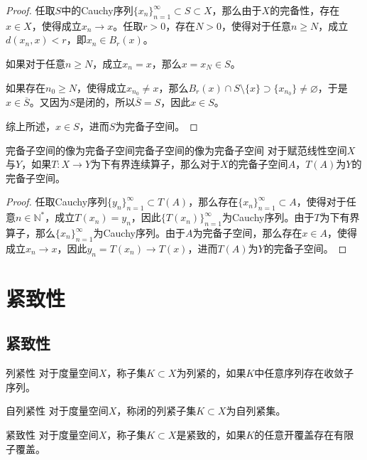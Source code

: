 \documentclass[lang = cn, scheme = chinese, thmcnt = section]{elegantbook}
\newcommand{\N}{\mathbb{N}}            %
\newcommand{\sub}{\subset}             %
\begin{document}
\begin{proof}
	任取$S$中的Cauchy序列$\{x_n\}_{n=1}^\infty \subset S \subset X$，那么由于$X$的完备性，存在$x\in X$，使得成立$x_n\to x$。任取$r>0$，存在$N>0$，使得对于任意$n\ge N$，成立$d(x_n,x)<r$，即$x_n\in B_r(x)$。
	
	如果对于任意$n\ge N$，成立$x_n=x$，那么$x=x_N\in S$。
	
	如果存在$n_0\ge N$，使得成立$x_{n_0}\ne x$，那么$B_r(x)\cap S \setminus \{x\} \supset \{ x_{n_0} \}\ne\varnothing$，于是$x\in\overline{S}$。又因为$S$是闭的，所以$\overline{S}=S$，因此$x\in S$。
	
	综上所述，$x\in S$，进而$S$为完备子空间。
\end{proof}

\begin{theorem}{完备子空间的像为完备子空间}{完备子空间的像为完备子空间}
	对于赋范线性空间$X$与$Y$，如果$T:X\to Y$为下有界连续算子，那么对于$X$的完备子空间$A$，$T(A)$为$Y$的完备子空间。
\end{theorem}

\begin{proof}
	任取Cauchy序列$\{y_n\}_{n=1}^{\infty}\sub T(A)$，那么存在$\{ x_n \}_{n=1}^{\infty}\sub A$，使得对于任意$n\in\N^*$，成立$T(x_n)=y_n$，因此$\{ T(x_n) \}_{n=1}^{\infty}$为Cauchy序列。由于$T$为下有界算子，那么$\{ x_n \}_{n=1}^{\infty}$为Cauchy序列。由于$A$为完备子空间，那么存在$x\in A$，使得成立$x_n\to x$，因此$y_n=T(x_n)\to T(x)$，进而$T(A)$为$Y$的完备子空间。
\end{proof}

\section{紧致性}

\subsection{紧致性}

\begin{definition}{列紧性}
	对于度量空间$X$，称子集$K\sub X$为列紧的，如果$K$中任意序列存在收敛子序列。
\end{definition}

\begin{definition}{自列紧性}
	对于度量空间$X$，称闭的列紧子集$K\sub X$为自列紧集。
\end{definition}

\begin{definition}{紧致性}
	对于度量空间$X$，称子集$K\sub X$是紧致的，如果$K$的任意开覆盖存在有限子覆盖。
\end{definition}
\end{document}
